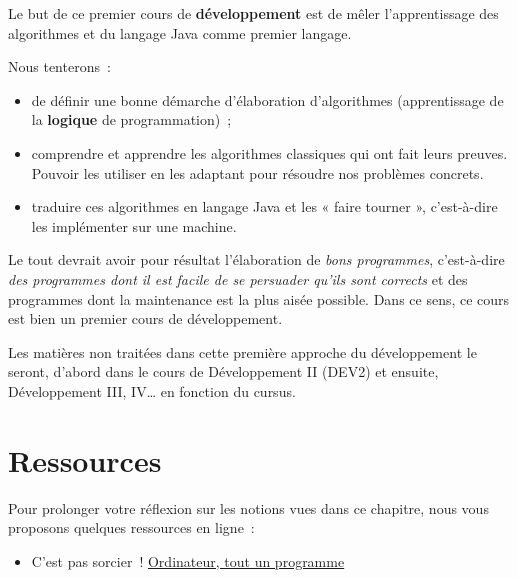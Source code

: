 		Le but de ce premier cours de \textbf{développement} est de mêler 
		l'apprentissage des algorithmes et du langage Java comme premier 
		langage. 
		
		Nous tenterons~:
	
		\begin{itemize}
		\item
			de définir une bonne démarche d’élaboration d’algorithmes
			(apprentissage de la \textbf{logique} de programmation)~;
		\item
			comprendre et apprendre les algorithmes classiques 
			qui ont fait leurs preuves.
			Pouvoir les utiliser en les adaptant 
			pour résoudre nos problèmes concrets.
		\item
			traduire ces algorithmes en langage Java et les « faire tourner », 
			c'est-à-dire les implémenter sur une machine.
		\end{itemize}
	
		Le tout devrait avoir pour résultat l’élaboration 
		de \textit{bons programmes}, 
		c’est-à-dire \textit{des programmes dont il est facile de
		se persuader qu’ils sont corrects} et des programmes dont la
		maintenance est la plus aisée possible. 
		Dans ce sens, ce cours est bien un premier cours de développement.
		
		Les matières non traitées dans cette première approche du développement 
		le seront, d'abord dans le cours de Développement II (DEV2) et ensuite,
		Développement III, IV… en fonction du cursus. 

	\section{Ressources}
	
		Pour prolonger votre réflexion 
		sur les notions vues dans ce chapitre, 
		nous vous proposons quelques ressources en ligne~:
		\begin{itemize}
		\item
			C'est pas sorcier~! 
			\href{https://www.youtube.com/watch?v=c96KP5jZVYk}
			{Ordinateur, tout un programme}
		\end{itemize}
